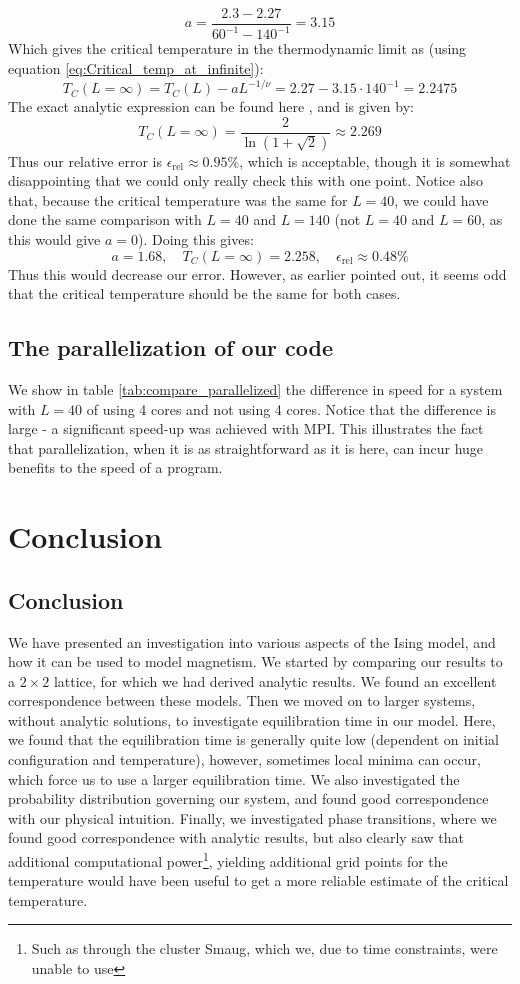 \documentclass[a4paper, 10pt]{article}
\begin{document}
$$a=\frac{2.3-2.27}{60^{-1}-140^{-1}}=3.15$$
Which gives the critical temperature in the thermodynamic limit as (using equation \ref{eq:Critical_temp_at_infinite}):
$$T_C(L=\infty)=T_C(L)-aL^{-1/\nu}=2.27-3.15\cdot 140^{-1}=2.2475$$
The exact analytic expression can be found here \cite{Project}, and is given by:
$$T_C(L=\infty)=\frac{2}{\ln(1+\sqrt{2})}\approx2.269$$
Thus our relative error is $\epsilon_{\mathrm{rel}}\approx 0.95 \%$, which is acceptable, though it is somewhat disappointing that we could only really check this with one point. Notice also that, because the critical temperature was the same for $L=40$, we could have done the same comparison with $L=40$ and $L=140$ (not $L=40$ and $L=60$, as this would give $a=0$). Doing this gives:
$$a=1.68, \quad T_C(L=\infty)=2.258, \quad \epsilon_{\mathrm{rel}}\approx 0.48 \%$$
Thus this would decrease our error. However, as earlier pointed out, it seems odd that the critical temperature should be the same for both cases.
\subsection{The parallelization of our code}
We show in table \ref{tab:compare_parallelized} the difference in speed for a system with $L=40$ of using 4 cores and not using 4 cores. Notice that the difference is large - a significant speed-up was achieved with MPI. This illustrates the fact that parallelization, when it is as straightforward as it is here, can incur huge benefits to the speed of a program.
\clearpage
\section{Conclusion}
\subsection{Conclusion}
We have presented an investigation into various aspects of the Ising model, and how it can be used to model magnetism. We started by comparing our results to a $2\times 2$ lattice, for which we had derived analytic results. We found an excellent correspondence between these models. Then we moved on to larger systems, without analytic solutions, to investigate equilibration time in our model. Here, we found that the equilibration time is generally quite low (dependent on initial configuration and temperature), however, sometimes local minima can occur, which force us to use a larger equilibration time. We also investigated the probability distribution governing our system, and found good correspondence with our physical intuition. Finally, we investigated phase transitions, where we found good correspondence with analytic results, but also clearly saw that additional computational power\footnote{Such as through the cluster Smaug, which we, due to time constraints, were unable to use}, yielding additional grid points for the temperature would have been useful to get a more reliable estimate of the critical temperature.
\end{document}
